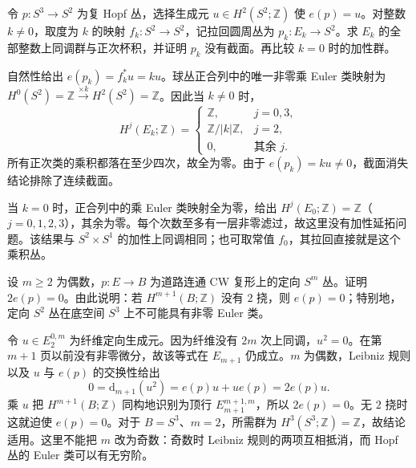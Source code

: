 \begin{exercise}\label{g2:ex:serre-hopf-pullback-degree}
	令 \(p:S^3\to S^2\) 为复 Hopf 丛，选择生成元 \(u\in H^2(S^2;\mathbb Z)\) 使 \(e(p)=u\)。对整数 \(k\ne0\)，取度为 \(k\) 的映射 \(f_k:S^2\to S^2\)，记拉回圆周丛为 \(p_k:E_k\to S^2\)。求 \(E_k\) 的全部整数上同调群与正次杯积，并证明 \(p_k\) 没有截面。再比较 \(k=0\) 时的加性群。
\end{exercise}
\begin{solution}
	自然性给出 \(e(p_k)=f_k^*u=ku\)。球丛正合列中的唯一非零乘 Euler 类映射为 \(H^0(S^2)=\mathbb Z\xrightarrow{\times k}H^2(S^2)=\mathbb Z\)。因此当 \(k\ne0\) 时，
	\[
		H^j(E_k;\mathbb Z)=
		\begin{cases}
			\mathbb Z,&j=0,3,\\
			\mathbb Z/|k|\mathbb Z,&j=2,\\
			0,&\text{其余 }j.
		\end{cases}
	\]
	所有正次类的乘积都落在至少四次，故全为零。由于 \(e(p_k)=ku\ne0\)，截面消失结论排除了连续截面。

	当 \(k=0\) 时，正合列中的乘 Euler 类映射全为零，给出 \(H^j(E_0;\mathbb Z)=\mathbb Z\)（\(j=0,1,2,3\)），其余为零。每个次数至多有一层非零滤过，故这里没有加性延拓问题。该结果与 \(S^2\times S^1\) 的加性上同调相同；也可取常值 \(f_0\)，其拉回直接就是这个乘积丛。
\end{solution}

\begin{exercise}\label{g2:ex:even-sphere-euler-two-torsion}
	设 \(m\ge2\) 为偶数，\(p:E\to B\) 为道路连通 CW 复形上的定向 \(S^m\) 丛。证明 \(2e(p)=0\)。由此说明：若 \(H^{m+1}(B;\mathbb Z)\) 没有 \(2\) 挠，则 \(e(p)=0\)；特别地，定向 \(S^2\) 丛在底空间 \(S^3\) 上不可能具有非零 Euler 类。
\end{exercise}
\begin{solution}
	令 \(u\in E_2^{0,m}\) 为纤维定向生成元。因为纤维没有 \(2m\) 次上同调，\(u^2=0\)。在第 \(m+1\) 页以前没有非零微分，故该等式在 \(E_{m+1}\) 仍成立。\(m\) 为偶数，Leibniz 规则以及 \(u\) 与 \(e(p)\) 的交换性给出
	\[
		0=\mathrm d_{m+1}(u^2)=e(p)u+u e(p)=2e(p)u.
	\]
	乘 \(u\) 把 \(H^{m+1}(B;\mathbb Z)\) 同构地识别为顶行 \(E_{m+1}^{m+1,m}\)，所以 \(2e(p)=0\)。无 \(2\) 挠时这就迫使 \(e(p)=0\)。对于 \(B=S^3\)、\(m=2\)，所需群为 \(H^3(S^3;\mathbb Z)=\mathbb Z\)，故结论适用。这里不能把 \(m\) 改为奇数：奇数时 Leibniz 规则的两项互相抵消，而 Hopf 丛的 Euler 类可以有无穷阶。
\end{solution}

